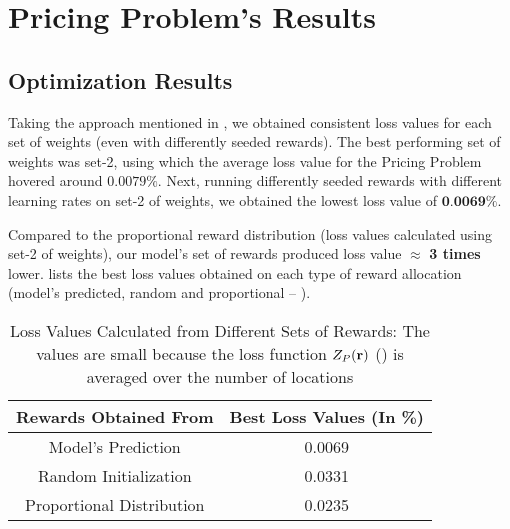 \section{Pricing Problem's Results} \label{sec:Pricing Problem's Results}
\subsection{Optimization Results} \label{sec:PriProbRes - Optimization}
Taking the approach mentioned in , we obtained consistent loss values for each set of weights (even with differently seeded rewards). The best performing set of weights was set-2, using which the average loss value for the Pricing Problem hovered around $0.0079\%$. Next, running differently seeded rewards with different learning rates on set-2 of weights, we obtained the lowest loss value of $\textbf{0.0069\%}$.

Compared to the proportional reward distribution (loss values calculated using set-2 of weights), our model's set of rewards produced loss value $\approx$ \textbf{3 times} lower.  lists the best loss values obtained on each type of reward allocation (model's predicted, random and proportional -- ).
\begin{table}[!htbp]
    \centering
    \caption[Loss Values Calculated from Different Sets of Rewards]{Loss Values Calculated from Different Sets of Rewards: The values are small because the loss function $Z_P(\mathbf{r})$ () is averaged over the number of locations}
    \label{tab:Loss Values Calculated from Different Sets of Rewards}
    \begin{tabular}{|c|c|}
        \hline
        \textbf{Rewards Obtained From} & \textbf{Best Loss Values (In \%)}\\
        \hline
        Model's Prediction & 0.0069\\
        Random Initialization & 0.0331\\
        Proportional Distribution & 0.0235\\
        \hline
    \end{tabular}
\end{table}


